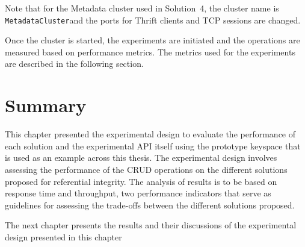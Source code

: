 Note that for the Metadata cluster used in Solution~4,  the  cluster name is
\texttt{MetadataCluster}and the ports for Thrift clients  and TCP sessions are
changed.  

Once the cluster is started,  the experiments are initiated and the operations
are measured based on performance metrics.  The metrics used for the experiments
are described in the following section. 









\section{Summary} \label{sexp:Summary} 

This chapter  presented the experimental design to evaluate the performance of
each  solution and the experimental \ac{API} itself using the prototype keyspace
that is used as an example across this thesis.  The experimental design involves
assessing the performance of the CRUD operations on the different solutions
proposed for referential integrity. 
The analysis of results is to be based on response time and throughput,  two
performance indicators that serve as guidelines for assessing the trade-offs
between the different solutions proposed. 
	
	
The next chapter presents the results and their discussions of the experimental
design presented in this chapter
 






